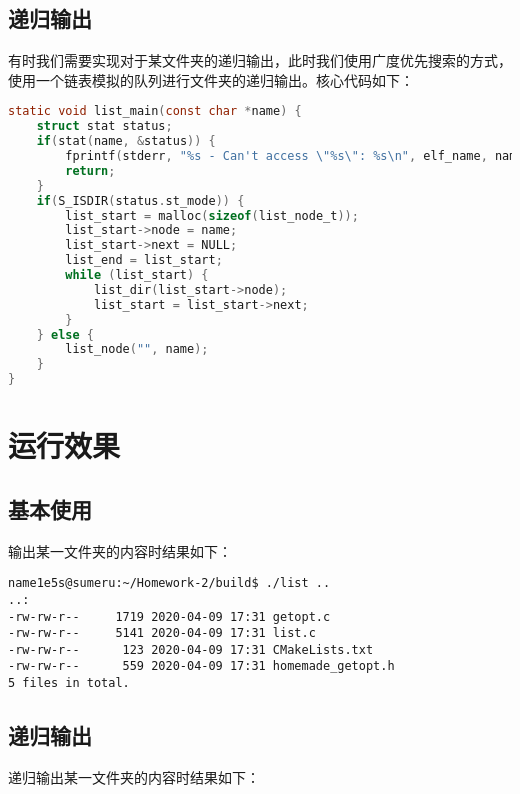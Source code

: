 \documentclass[blue,normal,cn]{elegantnote}
\begin{document}
\subsection{递归输出}
有时我们需要实现对于某文件夹的递归输出，此时我们使用广度优先搜索的方式，使用一个链表模拟的队列进行文件夹的递归输出。核心代码如下：

\begin{lstlisting}[language=C]
static void list_main(const char *name) {
    struct stat status;
    if(stat(name, &status)) {
        fprintf(stderr, "%s - Can't access \"%s\": %s\n", elf_name, name, strerror(errno));
        return;
    }
    if(S_ISDIR(status.st_mode)) {
        list_start = malloc(sizeof(list_node_t));
        list_start->node = name;
        list_start->next = NULL;
        list_end = list_start;
        while (list_start) {
            list_dir(list_start->node);
            list_start = list_start->next;
        }
    } else {
        list_node("", name);
    }
}
\end{lstlisting}

\section{运行效果}

\subsection{基本使用}
输出某一文件夹的内容时结果如下：

\begin{lstlisting}
name1e5s@sumeru:~/Homework-2/build$ ./list ..
..:
-rw-rw-r--     1719 2020-04-09 17:31 getopt.c
-rw-rw-r--     5141 2020-04-09 17:31 list.c
-rw-rw-r--      123 2020-04-09 17:31 CMakeLists.txt
-rw-rw-r--      559 2020-04-09 17:31 homemade_getopt.h
5 files in total.
\end{lstlisting}

\subsection{递归输出}
递归输出某一文件夹的内容时结果如下：
\end{document}
